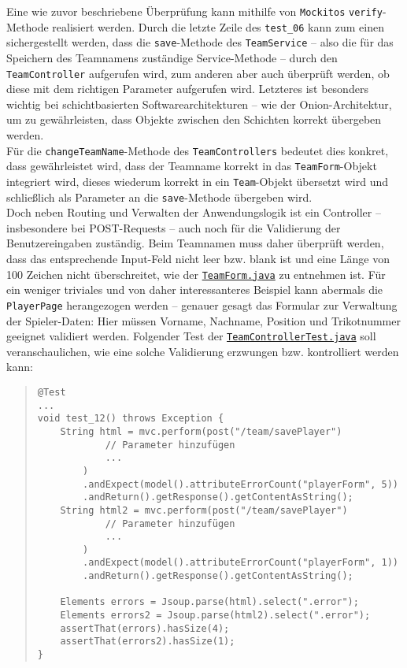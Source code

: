 Eine wie zuvor beschriebene Überprüfung kann mithilfe von \texttt{Mockitos} 
\texttt{verify}-Methode realisiert werden. Durch die letzte Zeile des 
\texttt{test\_06} kann zum einen sichergestellt werden, dass die 
\texttt{save}-Methode des \texttt{TeamService} -- also die für das Speichern des 
Teamnamens zuständige Service-Methode -- durch den \texttt{TeamController} 
aufgerufen wird, zum anderen aber auch überprüft werden, ob diese mit dem 
richtigen Parameter aufgerufen wird. Letzteres ist besonders wichtig bei 
schichtbasierten Softwarearchitekturen -- wie der Onion-Architektur, um zu 
gewährleisten, dass Objekte zwischen den Schichten korrekt übergeben werden. \\ 
Für die \texttt{changeTeamName}-Methode des \texttt{TeamControllers} bedeutet dies 
konkret, dass gewährleistet wird, dass der Teamname korrekt in das 
\texttt{TeamForm}-Objekt integriert wird, dieses wiederum korrekt in ein 
\texttt{Team}-Objekt übersetzt wird und schließlich als Parameter an die 
\texttt{save}-Methode übergeben wird. \\ 
Doch neben Routing und Verwalten der Anwendungslogik ist ein Controller -- 
insbesondere bei POST-Requests -- auch noch für die Validierung der 
Benutzereingaben zuständig. Beim Teamnamen muss daher überprüft werden, dass das 
entsprechende Input-Feld nicht leer bzw. blank ist und eine Länge von 100 Zeichen 
nicht überschreitet, wie der 
\href{https://github.com/FlorianOhmes/bat_spielzeitenplaner/blob/main/spielzeitenplaner/src/main/java/de/bathesis/spielzeitenplaner/web/forms/TeamForm.java}{\texttt{TeamForm.java}}
zu entnehmen ist. Für ein weniger triviales und von daher interessanteres Beispiel 
kann abermals die \texttt{PlayerPage} herangezogen werden -- genauer gesagt das 
Formular zur Verwaltung der Spieler-Daten: Hier müssen Vorname, Nachname, Position 
und Trikotnummer geeignet validiert werden. Folgender Test der 
\href{https://github.com/FlorianOhmes/bat_spielzeitenplaner/blob/main/spielzeitenplaner/src/test/java/de/bathesis/spielzeitenplaner/web/TeamControllerTest.java}{\texttt{TeamControllerTest.java}}
soll veranschaulichen, wie eine solche Validierung erzwungen bzw. kontrolliert 
werden kann: 

\begin{quote}
\begin{verbatim}
@Test
...
void test_12() throws Exception {
    String html = mvc.perform(post("/team/savePlayer")
            // Parameter hinzufügen 
            ... 
        )
        .andExpect(model().attributeErrorCount("playerForm", 5))
        .andReturn().getResponse().getContentAsString();
    String html2 = mvc.perform(post("/team/savePlayer")
            // Parameter hinzufügen
            ... 
        )
        .andExpect(model().attributeErrorCount("playerForm", 1))
        .andReturn().getResponse().getContentAsString();

    Elements errors = Jsoup.parse(html).select(".error");
    Elements errors2 = Jsoup.parse(html2).select(".error");
    assertThat(errors).hasSize(4);
    assertThat(errors2).hasSize(1);
}
\end{verbatim}
\end{quote}

